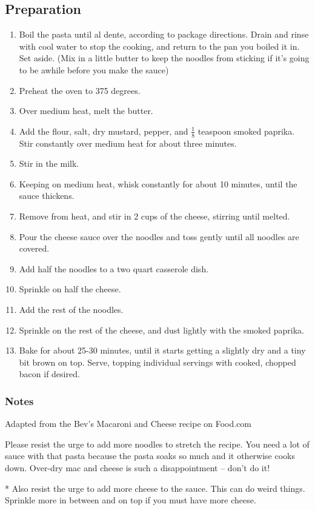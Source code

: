 \subsection{Preparation}
\begin{enumerate}
    \item Boil the pasta until al dente, according to package directions. Drain and rinse with cool water to stop the cooking, and return to the pan you boiled it in. Set aside. (Mix in a little butter to keep the noodles from sticking if it’s going to be awhile before you make the sauce)
    \item Preheat the oven to 375 degrees.
    \item Over medium heat, melt the butter.
    \item Add the flour, salt, dry mustard, pepper, and $\frac{1}{8}$ teaspoon smoked paprika. Stir constantly over medium heat for about three minutes.
    \item Stir in the milk.
    \item Keeping on medium heat, whisk constantly for about 10 minutes, until the sauce thickens.
    \item Remove from heat, and stir in 2 cups of the cheese, stirring until melted.
    \item Pour the cheese sauce over the noodles and toss gently until all noodles are covered.
    \item Add half the noodles to a two quart casserole dish.
    \item Sprinkle on half the cheese.
    \item Add the rest of the noodles.
    \item Sprinkle on the rest of the cheese, and dust lightly with the smoked paprika.
    \item Bake for about 25-30 minutes, until it starts getting a slightly dry and a tiny bit brown on top. Serve, topping individual servings with cooked, chopped bacon if desired.
\end{enumerate}
 
\subsubsection{Notes}
Adapted from the Bev’s Macaroni and Cheese recipe on Food.com 

\noindent * Please resist the urge to add more noodles to stretch the recipe. You need a lot of sauce with that pasta because the pasta soaks so much and it otherwise cooks down. Over-dry mac and cheese is such a disappointment – don't do it! 

\noindent ** Also resist the urge to add more cheese to the sauce. This can do weird things. Sprinkle more in between and on top if you must have more cheese.
